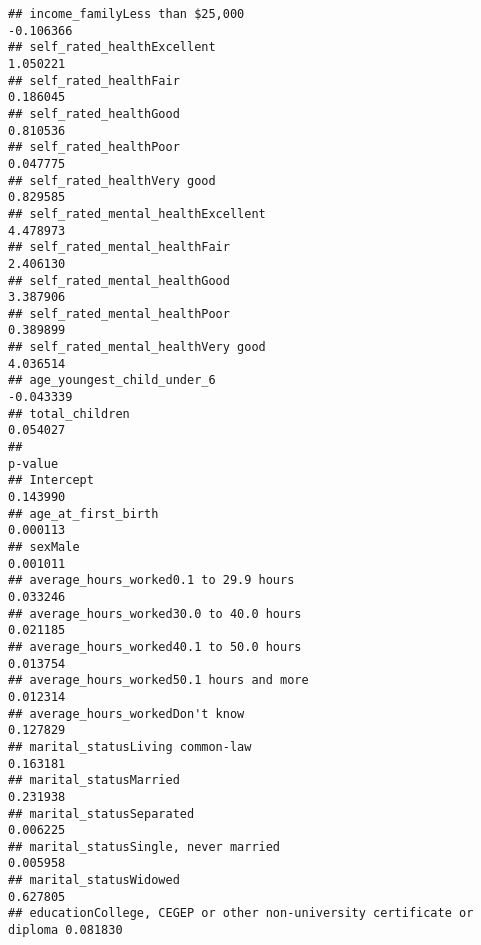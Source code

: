 \documentclass[
]{article}
\begin{document}
\begin{verbatim}
## income_familyLess than $25,000                                         -0.106366                       
## self_rated_healthExcellent                                             1.050221                        
## self_rated_healthFair                                                  0.186045                        
## self_rated_healthGood                                                  0.810536                        
## self_rated_healthPoor                                                  0.047775                        
## self_rated_healthVery good                                             0.829585                        
## self_rated_mental_healthExcellent                                      4.478973                        
## self_rated_mental_healthFair                                           2.406130                        
## self_rated_mental_healthGood                                           3.387906                        
## self_rated_mental_healthPoor                                           0.389899                        
## self_rated_mental_healthVery good                                      4.036514                        
## age_youngest_child_under_6                                             -0.043339                       
## total_children                                                         0.054027                        
##                                                                        p-value 
## Intercept                                                              0.143990
## age_at_first_birth                                                     0.000113
## sexMale                                                                0.001011
## average_hours_worked0.1 to 29.9 hours                                  0.033246
## average_hours_worked30.0 to 40.0 hours                                 0.021185
## average_hours_worked40.1 to 50.0 hours                                 0.013754
## average_hours_worked50.1 hours and more                                0.012314
## average_hours_workedDon't know                                         0.127829
## marital_statusLiving common-law                                        0.163181
## marital_statusMarried                                                  0.231938
## marital_statusSeparated                                                0.006225
## marital_statusSingle, never married                                    0.005958
## marital_statusWidowed                                                  0.627805
## educationCollege, CEGEP or other non-university certificate or diploma 0.081830

\end{verbatim}
\end{document}

